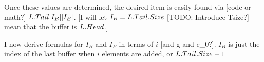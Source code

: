 
Once these values are determined, the desired item is easily found via [code or math?] $L.Tail[I_B][I_E]$. [I will let $I_B = L.Tail.Size$ [TODO: Introduce Tsize?] mean that the buffer is $L.Head$.]

I now derive formulas for $I_B$ and $I_E$ in terms of $i$ [and g and c_0?]. $I_B$ is just the index of the last buffer when $i$ elements are added, or $L.Tail.Size - 1$
